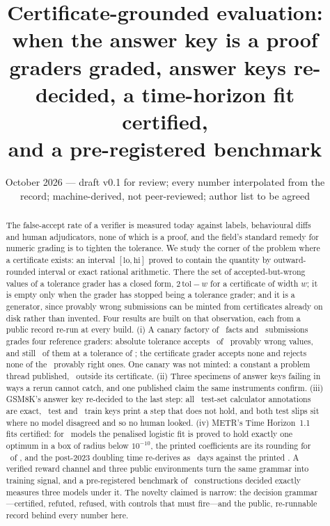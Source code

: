 \documentclass[11pt]{article}
\title{Certificate-grounded evaluation: when the answer key is a proof\\
\large graders graded, answer keys re-decided, a time-horizon fit certified,\\ and a pre-registered benchmark}
\author{\cmauthor}
\date{October 2026 --- draft v0.1 for review; every number interpolated from the record; machine-derived, not peer-reviewed; author list to be agreed}
\theoremstyle{definition}
\newcommand{\tol}{\mathrm{tol}}
\newcommand{\lo}{\mathrm{lo}}
\newcommand{\hi}{\mathrm{hi}}
\begin{document}
\maketitle

\begin{abstract}
The false-accept rate of a verifier is measured today against labels, behavioural diffs and human adjudicators, none of which is a proof, and the field's standard remedy for numeric grading is to tighten the tolerance. We study the corner of the problem where a certificate exists: an interval $[\lo,\hi]$ proved to contain the quantity by outward-rounded interval or exact rational arithmetic. There the set of accepted-but-wrong values of a tolerance grader has a closed form, $2\,\tol-w$ for a certificate of width $w$; it is empty only when the grader has stopped being a tolerance grader; and it is a generator, since provably wrong submissions can be minted from certificates already on disk rather than invented. Four results are built on that observation, each from a public record re-run at every build. (i) A canary factory of \CorpusFacts\ facts and \Submissions\ submissions grades four reference graders: absolute tolerance accepts \AbsFA\ of \Wrong\ provably wrong values, and still \AbsFAtight\ of them at a tolerance of \TolTight; the certificate grader accepts none and rejects none of the \Right\ provably right ones. One canary was not minted: a constant a problem thread published, \PubGap\ outside its certificate. (ii) Three specimens of answer keys failing in ways a rerun cannot catch, and one published claim the same instruments confirm. (iii) GSM8K's answer key re-decided to the last step: all \TestAnn\ test-set calculator annotations are exact, \WrongTest\ test and \WrongTrain\ train keys print a step that does not hold, and both test slips sit where no model disagreed and so no human looked. (iv) METR's Time Horizon~1.1 fits certified: for \HzLive\ models the penalised logistic fit is proved to hold exactly one optimum in a box of radius below $10^{-10}$, the printed coefficients are its rounding for \HzCoefRepro\ of \HzLive, and the post-2023 doubling time re-derives as \HzDoubling\ days against the printed \HzDoublingPrinted. A verified reward channel and three public environments turn the same grammar into training signal, and a pre-registered benchmark of \MbRungs\ constructions decided exactly measures three models under it. The novelty claimed is narrow: the decision grammar---certified, refuted, refused, with controls that must fire---and the public, re-runnable record behind every number here.
\end{abstract}
\end{document}
